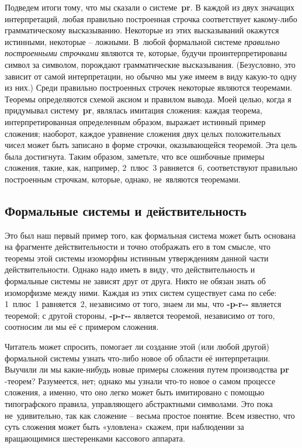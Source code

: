 \documentclass[../main.tex]{subfiles}
\begin{document}
Подведем итоги тому, что мы сказали о системе~\textbf{pr}.
В каждой из двух значащих интерпретаций, любая правильно построенная строчка соответствует какому-либо грамматическому высказыванию.
Некоторые из этих высказываний окажутся истинными, некоторые \--- ложными.
В~любой формальной системе \emph{правильно построенными строчками} являются те, которые, будучи проинтерпретированы символ за символом, порождают грамматические высказывания. (Безусловно, это зависит от самой интерпретации, но обычно мы уже имеем в виду какую-то одну из них.)
Среди правильно построенных строчек некоторые являются теоремами.
Теоремы определяются схемой аксиом и правилом вывода.
Моей целью, когда я придумывал систему~\textbf{pr}, являлась имитация сложения: каждая теорема, интерпретированная определенным образом, выражает истинный пример сложения; наоборот, каждое уравнение сложения двух целых положительных чисел может быть записано в форме строчки, оказывающейся теоремой.
Эта цель была достигнута.
Таким образом, заметьте, что все ошибочные примеры сложения, такие, как, например, 2~плюс~3 равняется~6, соответствуют правильно построенным строчкам, которые, однако, не~являются теоремами.


\subsection{Формальные системы и действительность}

Это был наш первый пример того, как формальная система может быть основана на фрагменте действительности и точно отображать его в том смысле, что теоремы этой системы изоморфны истинным утверждениям данной части действительности. Однако надо иметь в виду, что действительность и формальные системы не зависят друг от друга. Никто не обязан знать об изоморфизме между ними. Каждая из этих систем существует сама по себе: 1~плюс~1 равняется~2, независимо от того, знаем ли мы, что \textbf{-p-r-{}-} является теоремой; с другой стороны, \textbf{-p-r-{}-} является теоремой, независимо от того, соотносим ли мы её с примером сложения.

Читатель может спросить, помогает ли создание этой (или любой другой) формальной системы узнать что-либо новое об области её интерпретации.
Выучили ли мы какие-нибудь новые примеры сложения путем производства \textbf{pr} -теорем? Разумеется, нет; однако мы узнали что-то новое о самом процессе сложения, а именно, что оно легко может быть имитировано с помощью типографского правила, управляющего абстрактными символами. Это пока не~удивительно, так как сложение \--- весьма простое понятие. Всем известно, что суть сложения может быть «уловлена» скажем, при наблюдении за вращающимися шестеренками кассового аппарата.
\end{document}
